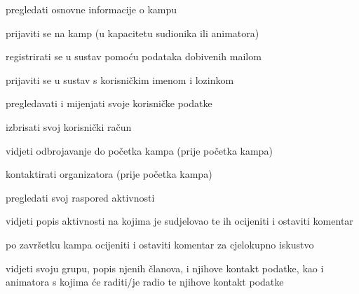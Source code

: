 			
			\begin{packed_enum}
				\item  {}
				
				\begin{packed_enum}
					
					\item pregledati osnovne informacije o kampu
					\item prijaviti se na kamp (u kapacitetu sudionika ili animatora)
					\item  registrirati se u sustav pomoću podataka dobivenih mailom
					\item prijaviti se u sustav s korisničkim imenom i lozinkom
				\end{packed_enum}
			
				\item  {}
				
				\begin{packed_enum}
					
					\item pregledavati i mijenjati svoje korisničke podatke
					\item izbrisati svoj korisnički račun 
					
				\end{packed_enum}
					\item  {}
				\begin{packed_enum}
					
					\item vidjeti odbrojavanje do početka kampa (prije početka kampa)
					\item kontaktirati organizatora (prije početka kampa)
					\item pregledati svoj raspored aktivnosti
					\item vidjeti popis aktivnosti na kojima je sudjelovao te ih ocijeniti i ostaviti komentar
					\item po završetku kampa ocijeniti i ostaviti komentar za cjelokupno iskustvo
					
				\end{packed_enum}
					\item  {}
				\begin{packed_enum}
					
				    \item vidjeti svoju grupu, popis njenih članova, i njihove kontakt podatke, kao i animatora s kojima će raditi/je radio te njihove kontakt podatke
					

\end{packed_enum}
\end{packed_enum}
